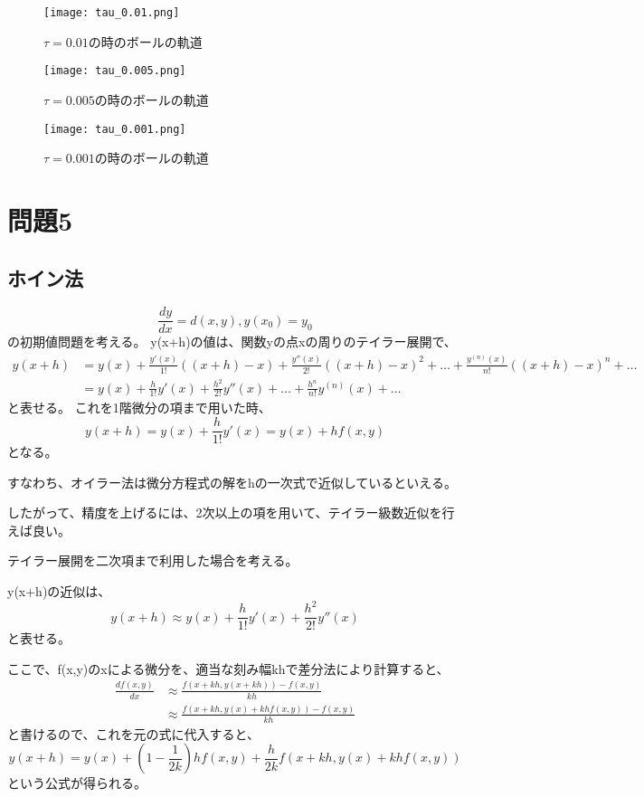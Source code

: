 \documentclass[a4paper, 11pt, titlepage]{jsarticle}
\begin{document}
\begin{figure}[H]
	\centering
	\texttt{[image: tau\_0.01.png]}
	\caption{$\tau = 0.01$の時のボールの軌道}
	\label{fig:tau_0.01}
\end{figure}

\begin{figure}[H]
	\centering
	\texttt{[image: tau\_0.005.png]}
	\caption{$\tau = 0.005$の時のボールの軌道}
	\label{fig:tau_0.005}
\end{figure}

\begin{figure}[H]
	\centering
	\texttt{[image: tau\_0.001.png]}
	\caption{$\tau = 0.001$の時のボールの軌道}
	\label{fig:tau_0.001}
\end{figure}

\section{問題5}
\subsection{ホイン法}
$$
\frac{dy}{dx} = d(x,y), y(x_0) = y_0
$$
の初期値問題を考える。
y(x+h)の値は、関数yの点xの周りのテイラー展開で、
\begin{align*}
	y(x+h) &= y(x) + \frac{y'(x)}{1!}((x+h) - x) + \frac{y''(x)}{2!}((x+h) - x)^2 + \dots + \frac{y^{(n)}(x)}{n!}((x+h) - x)^n + \dots\\
	&= y(x) + \frac{h}{1!}y'(x) + \frac{h^2}{2!}y''(x) + \dots + \frac{h^n}{n!}y^{(n)}(x) + \dots
\end{align*}
と表せる。
これを1階微分の項まで用いた時、
$$
y(x+h) = y(x) + \frac{h}{1!}y'(x) = y(x) + hf(x,y)
$$
となる。

すなわち、オイラー法は微分方程式の解をhの一次式で近似しているといえる。

したがって、精度を上げるには、2次以上の項を用いて、テイラー級数近似を行えば良い。

テイラー展開を二次項まで利用した場合を考える。

y(x+h)の近似は、
$$
y(x+h) \approx y(x) + \frac{h}{1!}y'(x) + \frac{h^2}{2!}y''(x)
$$
と表せる。

ここで、f(x,y)のxによる微分を、適当な刻み幅khで差分法により計算すると、
\begin{align*}
	\frac{df(x,y)}{dx} &\approx \frac{f(x+kh, y(x+kh)) - f(x,y)}{kh}\\
	&\approx \frac{f(x+kh, y(x) + khf(x,y)) - f(x,y)}{kh}
\end{align*}
と書けるので、これを元の式に代入すると、
$$
y(x+h) = y(x) + (1 - \frac{1}{2k})hf(x,y) + \frac{h}{2k}f(x+kh, y(x) + khf(x,y))
$$
という公式が得られる。
\end{document}
